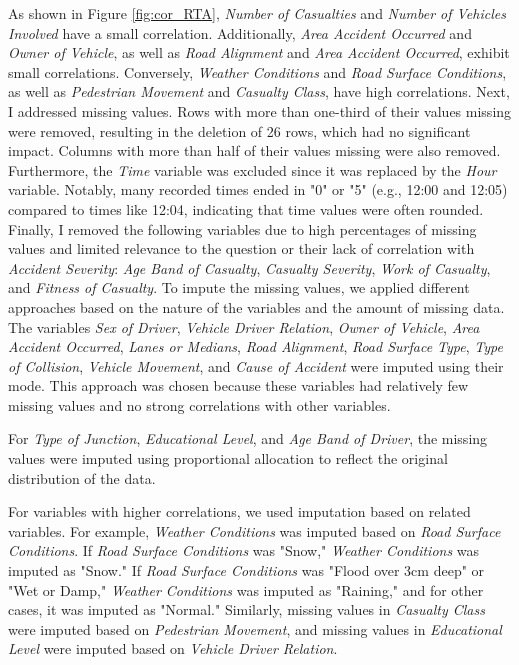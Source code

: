 \documentclass{article}
\begin{document}
As shown in Figure \ref{fig:cor_RTA}, \textit{Number of Casualties} and \textit{Number of Vehicles Involved} have a small correlation. Additionally, \textit{Area Accident Occurred} and \textit{Owner of Vehicle}, as well as \textit{Road Alignment} and \textit{Area Accident Occurred}, exhibit small correlations. Conversely, \textit{Weather Conditions} and \textit{Road Surface Conditions}, as well as \textit{Pedestrian Movement} and \textit{Casualty Class}, have high correlations.
Next, I addressed missing values. Rows with more than one-third of their values missing were removed, resulting in the deletion of 26 rows, which had no significant impact. Columns with more than half of their values missing were also removed. Furthermore, the \textit{Time} variable was excluded since it was replaced by the \textit{Hour} variable. Notably, many recorded times ended in "0" or "5" (e.g., 12:00 and 12:05) compared to times like 12:04, indicating that time values were often rounded.
Finally, I removed the following variables due to high percentages of missing values and limited relevance to the question or their lack of correlation with \textit{Accident Severity}: \textit{Age Band of Casualty}, \textit{Casualty Severity}, \textit{Work of Casualty}, and \textit{Fitness of Casualty}.
\newline
To impute the missing values, we applied different approaches based on the nature of the variables and the amount of missing data. The variables \textit{Sex of Driver}, \textit{Vehicle Driver Relation}, \textit{Owner of Vehicle}, \textit{Area Accident Occurred}, \textit{Lanes or Medians}, \textit{Road Alignment}, \textit{Road Surface Type}, \textit{Type of Collision}, \textit{Vehicle Movement}, and \textit{Cause of Accident} were imputed using their mode. This approach was chosen because these variables had relatively few missing values and no strong correlations with other variables.

For \textit{Type of Junction}, \textit{Educational Level}, and \textit{Age Band of Driver}, the missing values were imputed using proportional allocation to reflect the original distribution of the data.

For variables with higher correlations, we used imputation based on related variables. For example, \textit{Weather Conditions} was imputed based on \textit{Road Surface Conditions}. If \textit{Road Surface Conditions} was "Snow," \textit{Weather Conditions} was imputed as "Snow." If \textit{Road Surface Conditions} was "Flood over 3cm deep" or "Wet or Damp," \textit{Weather Conditions} was imputed as "Raining," and for other cases, it was imputed as "Normal." Similarly, missing values in \textit{Casualty Class} were imputed based on \textit{Pedestrian Movement}, and missing values in \textit{Educational Level} were imputed based on \textit{Vehicle Driver Relation}.
\end{document}
